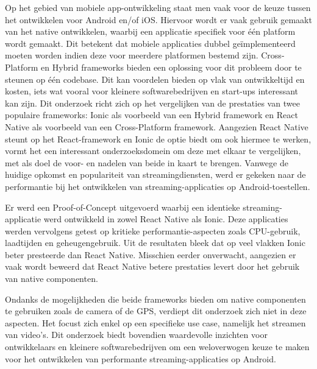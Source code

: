 Op het gebied van mobiele app-ontwikkeling staat men vaak voor de keuze tussen het ontwikkelen voor Android en/of iOS. Hiervoor wordt er vaak gebruik gemaakt van het native ontwikkelen, waarbij een applicatie specifiek voor één platform wordt gemaakt. Dit betekent dat mobiele applicaties dubbel geïmplementeerd moeten worden indien deze voor meerdere platformen bestemd zijn. Cross-Platform en Hybrid frameworks bieden een oplossing voor dit probleem door te steunen op één codebase. Dit kan voordelen bieden op vlak van ontwikkeltijd en kosten, iets wat vooral voor kleinere softwarebedrijven en start-ups interessant kan zijn. Dit onderzoek richt zich op het vergelijken van de prestaties van twee populaire frameworks: Ionic als voorbeeld van een Hybrid framework en React Native als voorbeeld van een Cross-Platform framework. Aangezien React Native steunt op het React-framework en Ionic de optie biedt om ook hiermee te werken, vormt het een interessant onderzoeksdomein om deze met elkaar te vergelijken, met als doel de voor- en nadelen van beide in kaart te brengen. Vanwege de huidige opkomst en populariteit van streamingdiensten, werd er gekeken naar de performantie bij het ontwikkelen van streaming-applicaties op Android-toestellen. 

Er werd een Proof-of-Concept uitgevoerd waarbij een identieke streaming-applicatie werd ontwikkeld in zowel React Native als Ionic. Deze applicaties werden vervolgens getest op kritieke performantie-aspecten zoals CPU-gebruik, laadtijden en geheugengebruik. Uit de resultaten bleek dat op veel vlakken Ionic beter presteerde dan React Native. Misschien eerder onverwacht, aangezien er vaak wordt beweerd dat React Native betere prestaties levert door het gebruik van native componenten.

Ondanks de mogelijkheden die beide frameworks bieden om native componenten te gebruiken zoals de camera of de GPS, verdiept dit onderzoek zich niet in deze aspecten. Het focust zich enkel op een specifieke use case, namelijk het streamen van video's. Dit onderzoek biedt bovendien waardevolle inzichten voor ontwikkelaars en kleinere softwarebedrijven om een weloverwogen keuze te maken voor het ontwikkelen van performante streaming-applicaties op Android.









